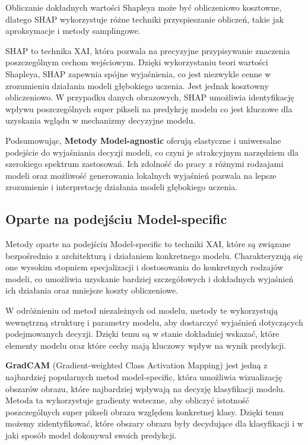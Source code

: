 Obliczanie dokładnych wartości Shapleya może być obliczeniowo kosztowne, dlatego SHAP wykorzystuje różne techniki przyspieszanie obliczeń, takie jak aproksymacje i metody samplingowe.

SHAP to technika XAI, która pozwala na precyzyjne przypisywanie znaczenia poszczególnym cechom wejściowym.
Dzięki wykorzystaniu teori wartości Shapleya, SHAP zapewnia spójne wyjaśnienia, co jest niezwykle cenne w zrozumieniu działania modeli głębokiego uczenia.
Jest jednak kosztowny obliczeniowo.
W przypadku danych obrazowych, SHAP umożliwia identyfikację wpływu poszczególnych super pikseli na predykcję modelu co jest kluczowe dla uzyskania wglądu w mechanizmy decyzyjne modelu.

\vspace{1cm}
Podsumowując, \textbf{Metody Model-agnostic} oferują elastyczne i uniwersalne podejście do wyjaśniania decyzji modeli, co czyni je atrakcyjnym narzędziem dla szerokiego spektrum zastosowań.
Ich zdolność do pracy z różnymi rodzajami modeli oraz możliwość generowania lokalnych wyjaśnień pozwala na lepsze zrozumienie i interpretację działania modeli głębokiego uczenia.

\subsection*{Oparte na podejściu Model-specific}
Metody oparte na podejściu Model-specific to techniki XAI, które są związane bezpośrednio z architekturą i działaniem konkretnego modelu.
Charakteryzują się one wysokim stopniem specjalizacji i dostosowania do konkretnych rodzajów modeli, co umożliwia uzyskanie bardziej szczegółowych i dokładnych wyjaśnień ich działania oraz mniejsze koszty obliczeniowe.

W odróżnieniu od metod niezależnych od modelu, metody te wykorzystują wewnętrzną strukturę i parametry modelu, aby dostarczyć wyjaśnień dotyczących podejmowanych decyzji.
Dzięki temu są w stanie dokładniej wskazać, które elementy modelu oraz które cechy mają kluczowy wpływ na wynik predykcji.

\textbf{GradCAM} \cite{Selvaraju_2019} (Gradient-weighted Class Activation Mapping) jest jedną z najbardziej popularnych metod model-specific, która umożliwia wizualizację obszarów obrazu, które najbardziej wpływają na decyzję klasyfikacji modelu.
Metoda ta wykorzystuje gradienty wsteczne, aby obliczyć istotność poszczególnych super pikseli obrazu względem konkretnej klasy.
Dzięki temu możemy zidentyfikować, które obszary obrazu były decydujące dla klasyfikacji i w jaki sposób model dokonywał swoich predykcji.

